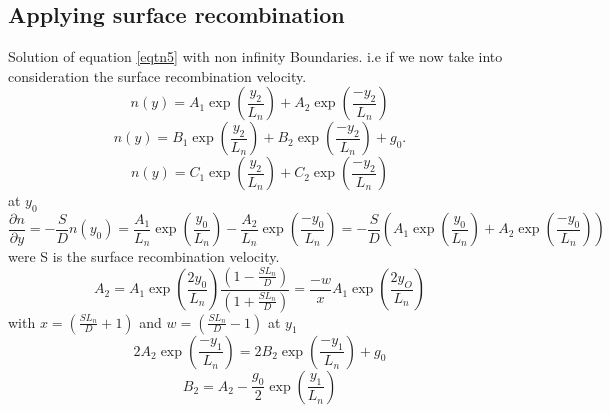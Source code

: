 \subsection{Applying surface recombination}\label{app:surface}

Solution of equation \ref{eqtn5} with non infinity Boundaries. i.e if we now take into consideration the surface recombination velocity. 
\begin{equation} \label{eqtn22}
 n(y) = A_1\exp \left(\frac{y_2}{L_n}\right) + A_2\exp \left(\frac{-y_2}{L_n}\right)
\end{equation}
\begin{equation} \label{eqtn23}
 n(y) =  B_1\exp \left(\frac{y_2}{L_n}\right) + B_2\exp \left(\frac{-y_2}{L_n}\right) + g_0.
\end{equation}
\begin{equation} \label{eqtn24}
 n(y) = C_1\exp \left(\frac{y_2}{L_n}\right) + C_2\exp \left(\frac{-y_2}{L_n}\right) 
\end{equation} 
at $y_0$
\begin{equation}\label{eqtnb1}
\frac{\partial n}{\partial y} = -\frac{S}{D}n(y_0) = \frac{A_1}{L_n}\exp \left(\frac{y_0}{L_n}\right)  - \frac{A_2}{L_n}\exp \left(\frac{-y_0}{L_n}\right)=-\frac{S}{D}\left(A_1\exp \left(\frac{y_0}{L_n}\right) + A_2\exp \left(\frac{-y_0}{L_n}\right)\right)
\end{equation}
were S is the surface recombination  velocity.
\begin{equation}\label{eqtnb2}
A_2 = A_1\exp \left(\frac{2y_0}{L_n}\right)\frac{\left(1-\frac{SL_n}{D}\right)}{\left(1+\frac{SL_n}{D}\right)} = \frac{-w}{x} A_1 \exp \left(\frac{2y_O}{L_n}\right)
\end{equation}
with $x =\left( \frac{SL_n}{D}+1\right)$ and $w  =\left(\frac{SL_n}{D}-1\right)$ 
at $y_1$
\begin{equation} \label{eqtnb3}
2A_2\exp \left(\frac{-y_1}{L_n}\right) = 2B_2\exp \left(\frac{-y_1}{L_n}\right) + g_0
\end{equation}
\begin{equation}\label{eqtnb4}
B_2 = A_2 - \frac{g_0}{2}\exp \left(\frac{y_1}{L_n}\right)
\end{equation}

